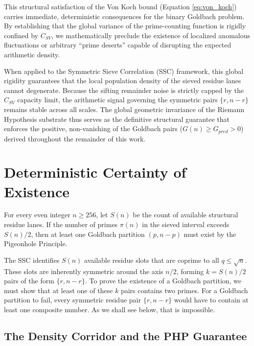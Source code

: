 \documentclass[twoside,9pt]{extarticle}
\begin{document}
This structural satisfaction of the Von Koch bound (Equation \ref{eq:von_koch}) carries immediate, deterministic consequences for the binary Goldbach problem. By establishing that the global variance of the prime-counting function is rigidly confined by $C_{SV}$, we mathematically preclude the existence of localized anomalous fluctuations or arbitrary ``prime deserts'' capable of disrupting the expected arithmetic density. 

When applied to the Symmetric Sieve Correlation (SSC) framework, this global rigidity guarantees that the local population density of the sieved residue lanes cannot degenerate. Because the sifting remainder noise is strictly capped by the $C_{SV}$ capacity limit, the arithmetic signal governing the symmetric pairs $\{r, n-r\}$ remains stable across all scales. The global geometric invariance of the Riemann Hypothesis substrate thus serves as the definitive structural guarantee that enforces the positive, non-vanishing of the Goldbach pairs ($G(n) \ge G_{pred} > 0$) derived throughout the remainder of this work.

\section{Deterministic Certainty of Existence}
\label{sec:determinism_certainty}

\begin{theorem}
\label{thm:combinatorial_necessity}
For every even integer $n \ge 256$, let $S(n)$ be the count of available structural residue lanes. If the number of primes $\pi(n)$ in the sieved interval exceeds $S(n)/2$, then at least one Goldbach partition $(p, n-p)$ must exist by the Pigeonhole Principle.
\end{theorem}

The SSC identifies $S(n)$ available residue slots that are coprime to all $q \le \sqrt{n}$. These slots are inherently symmetric around the axis $n/2$, forming $k = S(n)/2$ pairs of the form $\{r, n-r\}$. To prove the existence of a Goldbach partition, we must show that at least one of these $k$ pairs contains two primes. For a Goldbach partition to fail, every symmetric residue pair $\{r, n-r\}$ would have to contain at least
one composite number. As we shall see below, that is impossible.

\subsection{The Density Corridor and the PHP Guarantee}
\label{subsec:density_corridor}
\end{document}
